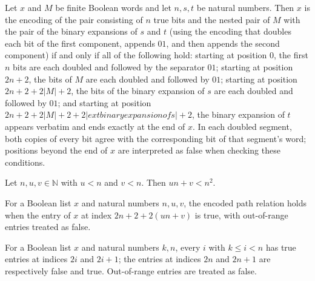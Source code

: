 \begin{lemma}
\label{Complexity.eq_pathRaw_iff}
\leanok
{}
Let $x$ and $M$ be finite Boolean words and let $n,s,t$ be natural numbers. Then $x$ is
the encoding of the pair consisting of $n$ true bits and the nested pair of $M$ with the
pair of the binary expansions of $s$ and $t$ (using the encoding that doubles each bit
of the first component, appends $01$, and then appends the second component) if and only
if all of the following hold: starting at position $0$, the first $n$ bits are each
doubled and followed by the separator $01$; starting at position $2n+2$, the bits of $M$
are each doubled and followed by $01$; starting at position $2n+2+2|M|+2$, the bits of
the binary expansion of $s$ are each doubled and followed by $01$; and starting at
position $2n+2+2|M|+2+2|	ext{binary expansion of }s|+2$, the binary expansion of $t$
appears verbatim and ends exactly at the end of $x$. In each doubled segment, both
copies of every bit agree with the corresponding bit of that segment's word; positions
beyond the end of $x$ are interpreted as false when checking these conditions.
\end{lemma}

\begin{lemma}
\label{Complexity.rowMajor_lt}
\leanok
{}
Let $n,u,v\in\mathbb{N}$ with $u<n$ and $v<n$. Then $un+v<n^2$.
\end{lemma}

\begin{definition}
\label{Complexity.pathEdge}
\leanok
For a Boolean list $x$ and natural numbers $n,u,v$, the encoded path relation holds when
the entry of $x$ at index $2n+2+2(un+v)$ is true, with out-of-range entries treated as
false.
\end{definition}

\begin{definition}
\label{Complexity.UnaryRest}
\leanok
For a Boolean list $x$ and natural numbers $k,n$, every $i$ with $k\le i<n$ has true
entries at indices $2i$ and $2i+1$; the entries at indices $2n$ and $2n+1$ are
respectively false and true. Out-of-range entries are treated as false.
\end{definition}

